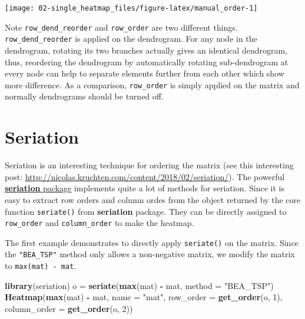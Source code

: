 \documentclass[]{book}
\newenvironment{Shaded}{\begin{snugshade}}{\end{snugshade}}
\newcommand{\KeywordTok}[1]{\textcolor[rgb]{0.13,0.29,0.53}{\textbf{#1}}}
\newcommand{\DataTypeTok}[1]{\textcolor[rgb]{0.13,0.29,0.53}{#1}}
\newcommand{\DecValTok}[1]{\textcolor[rgb]{0.00,0.00,0.81}{#1}}
\newcommand{\StringTok}[1]{\textcolor[rgb]{0.31,0.60,0.02}{#1}}
\newcommand{\OperatorTok}[1]{\textcolor[rgb]{0.81,0.36,0.00}{\textbf{#1}}}
\newcommand{\NormalTok}[1]{#1}
\theoremstyle{definition}
\theoremstyle{definition}
\theoremstyle{definition}
\theoremstyle{remark}
\begin{document}
\begin{center}\texttt{[image: 02-single\_heatmap\_files/figure-latex/manual\_order-1]} \end{center}

Note \texttt{row\_dend\_reorder} and \texttt{row\_order} are two
different things. \texttt{row\_dend\_reorder} is applied on the
dendrogram. For any node in the dendrogram, rotating its two branches
actually gives an identical dendrogram, thus, reordering the dendrogram
by automatically rotating sub-dendrogram at every node can help to
separate elements further from each other which show more difference. As
a comparison, \texttt{row\_order} is simply applied on the matrix and
normally dendrograms should be turned off.

\section{Seriation}\label{heatmap-seriation}

Seriation is an interesting technique for ordering the matrix (see this
interesting post:
\url{http://nicolas.kruchten.com/content/2018/02/seriation/}). The
powerful
\href{https://cran.r-project.org/web/packages/seriation/index.html}{\textbf{seriation}
package} implements quite a lot of methods for seriation. Since it is
easy to extract row orders and column ordes from the object returned by
the core function \texttt{seriate()} from \textbf{seriation} package.
They can be directly assigned to \texttt{row\_order} and
\texttt{column\_order} to make the heatmap.

The first example demonstrates to directly apply \texttt{seriate()} on
the matrix. Since the \texttt{"BEA\_TSP"} method only allows a
non-negative matrix, we modify the matrix to \texttt{max(mat)\ -\ mat}.

\begin{Shaded}
\begin{Highlighting}[]
\KeywordTok{library}\NormalTok{(seriation)}
\NormalTok{o =}\StringTok{ }\KeywordTok{seriate}\NormalTok{(}\KeywordTok{max}\NormalTok{(mat) }\OperatorTok{-}\StringTok{ }\NormalTok{mat, }\DataTypeTok{method =} \StringTok{"BEA_TSP"}\NormalTok{)}
\KeywordTok{Heatmap}\NormalTok{(}\KeywordTok{max}\NormalTok{(mat) }\OperatorTok{-}\StringTok{ }\NormalTok{mat, }\DataTypeTok{name =} \StringTok{"mat"}\NormalTok{, }
    \DataTypeTok{row_order =} \KeywordTok{get_order}\NormalTok{(o, }\DecValTok{1}\NormalTok{), }\DataTypeTok{column_order =} \KeywordTok{get_order}\NormalTok{(o, }\DecValTok{2}\NormalTok{))}
\end{Highlighting}
\end{Shaded}
\end{document}
